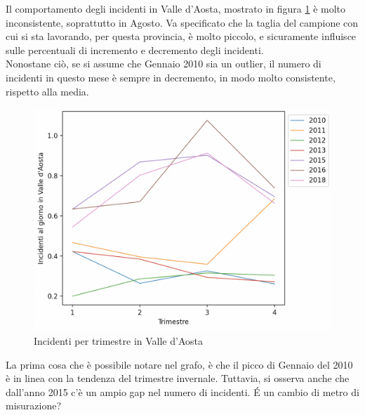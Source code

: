 \documentclass[a4paper]{report}
\begin{document}
Il comportamento degli incidenti in Valle d'Aosta, mostrato in figura \ref{fig:aosta-trimestre} 
è molto inconsistente, soprattutto in Agosto.
Va specificato che la taglia del campione con cui si sta lavorando, per questa provincia, 
è molto piccolo, e sicuramente influisce sulle percentuali di incremento e decremento 
degli incidenti.\\
Nonostane ciò, se si assume che Gennaio 2010 sia un outlier, il numero di incidenti in 
questo mese è sempre in decremento, in modo molto consistente, rispetto alla media.

\begin{figure}
    \includegraphics[width=\linewidth]{../src/incidenti/incidenti_senza_coords/mese_incidenti/aosta_timestre.png}
    \caption{Incidenti per trimestre in Valle d'Aosta}
    \label{fig:aosta-trimestre}
\end{figure}

La prima cosa che è possibile notare nel grafo, è che il picco di Gennaio del 2010 è 
in linea con la tendenza del trimestre invernale. 
Tuttavia, si osserva anche che dall'anno 2015 c'è un ampio gap nel numero di incidenti. 
\'E un cambio di metro di misurazione? 
\end{document}
